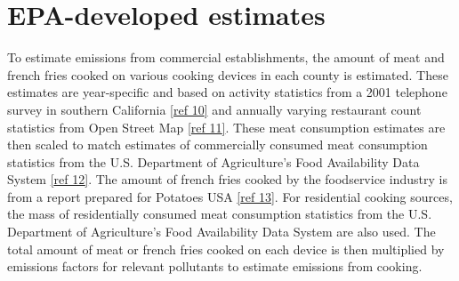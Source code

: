 \documentclass[
  11pt,
  oneside]{book}
\begin{document}
\begin{table}
\centering
\caption{\label{tab:cooking-sccs}Cooking SCCs in the 2023 NEI.}
\centering
{}
\end{table}

\section{EPA-developed estimates}\label{epa-developed-estimates}

To estimate emissions from commercial establishments, the amount of meat and french fries cooked on various cooking devices in each county is estimated. These estimates are year-specific and based on activity statistics from a 2001 telephone survey in southern California \hyperref[cooking-references]{{[}ref 10{]}} and annually varying restaurant count statistics from Open Street Map \hyperref[cooking-references]{{[}ref 11{]}}. These meat consumption estimates are then scaled to match estimates of commercially consumed meat consumption statistics from the U.S. Department of Agriculture's Food Availability Data System \hyperref[cooking-references]{{[}ref 12{]}}. The amount of french fries cooked by the foodservice industry is from a report prepared for Potatoes USA \hyperref[cooking-references]{{[}ref 13{]}}. For residential cooking sources, the mass of residentially consumed meat consumption statistics from the U.S. Department of Agriculture's Food Availability Data System are also used. The total amount of meat or french fries cooked on each device is then multiplied by emissions factors for relevant pollutants to estimate emissions from cooking.
\end{document}
